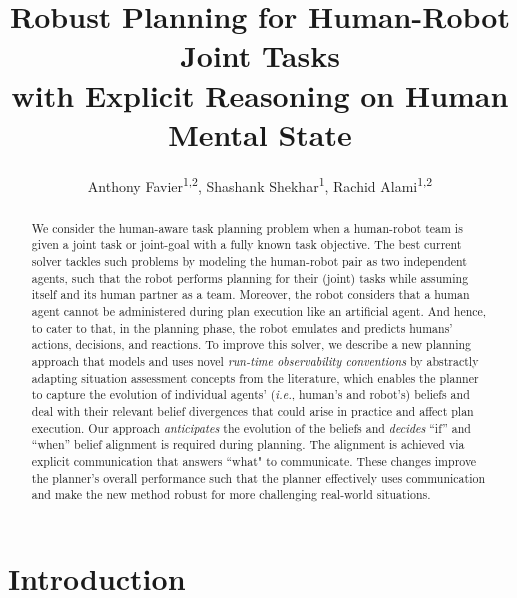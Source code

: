 \documentclass[letterpaper]{article} %
\title
{
Robust Planning for Human-Robot Joint Tasks \\ with Explicit Reasoning on Human Mental State
}
\author{
    Anthony Favier\textsuperscript{\rm 1,2},
    Shashank Shekhar\textsuperscript{\rm 1},
    Rachid Alami\textsuperscript{\rm 1,2}
}
\begin{document}


\maketitle

\begin{abstract}
% 
We consider the human-aware task planning problem when a human-robot team is given a joint task or joint-goal with a fully known task objective. 
The best current solver tackles such problems by modeling the human-robot pair as two independent agents, such that the robot performs planning for their (joint) tasks while assuming itself and its human partner as a team.
Moreover, the robot considers that a human agent cannot be administered during plan execution like an artificial agent. And hence, to cater to that, in the planning phase, the robot emulates and predicts humans' actions, decisions, and reactions. 
To improve this solver, we describe a new planning approach that models and uses novel {\em run-time observability conventions} by abstractly adapting  situation assessment concepts from the literature, which enables the planner to 
capture the evolution of individual agents' (\textit{i.e.}, human's and robot's) beliefs and deal with their relevant belief divergences that could arise in practice and affect plan execution. 
Our approach \textit{anticipates} the evolution of the beliefs and \textit{decides} ``if'' and ``when'' belief alignment is required during planning. The alignment is achieved via explicit communication that answers ``what" to communicate.
These changes improve the planner's overall performance such that the planner effectively uses communication and make the new method robust for more challenging real-world situations.  
\end{abstract}

\section{Introduction}
\end{document}
